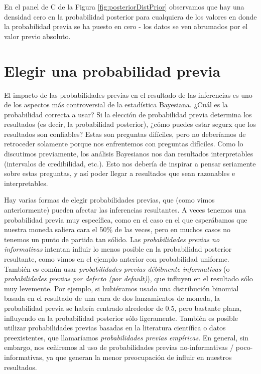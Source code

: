 \documentclass[
  12pt,
]{book}
\begin{document}
En el panel de C de la Figura \ref{fig:posteriorDistPrior} observamos que hay una densidad cero en la probabilidad posterior para cualquiera de los valores en donde la probabilidad previa se ha puesto en cero - los datos se ven abrumados por el valor previo absoluto.

\hypertarget{elegir-una-probabilidad-previa}{%
\section{Elegir una probabilidad previa}\label{elegir-una-probabilidad-previa}}

El impacto de las probabilidades previas en el resultado de las inferencias es uno de los aspectos más controversial de la estadística Bayesiana. ¿Cuál es la probabilidad correcta a usar? Si la elección de probabilidad previa determina los resultados (es decir, la probabilidad posterior), ¿cómo puedes estar segurx que los resultados son confiables? Estas son preguntas difíciles, pero no deberíamos de retroceder solamente porque nos enfrentemos con preguntas difíciles. Como lo discutimos previamente, los análisis Bayesianos nos dan resultados interpretables (intervalos de credibilidad, etc.). Esto nos debería de inspirar a pensar seriamente sobre estas preguntas, y así poder llegar a resultados que sean razonables e interpretables.

Hay varias formas de elegir probabilidades previas, que (como vimos anteriormente) pueden afectar las inferencias resultantes. A veces tenemos una probabilidad previa muy específica, como en el caso en el que esperábamos que nuestra moneda saliera cara el 50\% de las veces, pero en muchos casos no tenemos un punto de partida tan sólido. Las \emph{probabilidades previas no informativas} intentan influir lo menos posible en la probabilidad posterior resultante, como vimos en el ejemplo anterior con probabilidad uniforme. También es común usar \emph{probabilidades previas débilmente informativas} (o \emph{probabilidades previas por defecto (por default)}), que influyen en el resultado sólo muy levemente. Por ejemplo, si hubiéramos usado una distribución binomial basada en el resultado de una cara de dos lanzamientos de moneda, la probabilidad previa se habría centrado alrededor de 0.5, pero bastante plana, influyendo en la probabilidad posterior sólo ligeramente.
También es posible utilizar probabilidades previas basadas en la literatura científica o datos preexistentes, que llamaríamos \emph{probabilidades previas empíricas}. En general, sin embargo, nos ceñiremos al uso de probabilidades previas no-informativas / poco-informativas, ya que generan la menor preocupación de influir en nuestros resultados.
\end{document}
